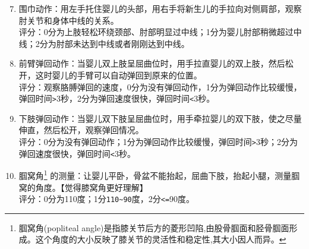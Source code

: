 \begin{enumerate}
\setcounter{enumi}{6}
\item
  围巾动作：用左手托住婴儿的头部，用右手将新生儿的手拉向对侧肩部，观察肘关节和身体中线的关系。\\
  评分：0分为上肢轻松环绕颈部、肘部明显过中线；1分为婴儿肘部稍微超过中线；2分为肘部未达到中线或者刚刚达到中线。%
\item
  前臂弹回动作：当婴儿双上肢呈屈曲位时，用手拉直婴儿的双上肢，然后松开，这时婴儿的手臂可以自动弹回到原来的位置。\\
  评分：观察胳膊弹回的速度，0分为没有弹回动作，1分为弹回动作比较缓慢，弹回时间\texttt{\textgreater{}}\hspace{0pt}3秒，2分为弹回速度很快，弹回时间\texttt{\textless{}}\hspace{0pt}3秒。%
\item
  下肢弹回动作：当婴儿双下肢呈屈曲位时，用手牵拉婴儿的双下肢，使之尽量伸直，然后松开，观察弹回情况。\\
  评分：0分为没有弹回动作；1分为弹回动作比较缓慢，弹回时间\texttt{\textgreater{}}\hspace{0pt}3秒；2分为弹回速度很快，弹回时间\texttt{\textless{}}\hspace{0pt}3秒。%
\item
  腘窝角\footnote{{\PinyinTi 腘}窝角(popliteal angle)是指膝关节后方的菱形凹陷,由股骨腘面和胫骨腘面形成。这个角度的大小反映了膝关节的灵活性和稳定性,其大小因人而异。}%
的测量：让婴儿平卧，骨盆不能抬起，屈曲下肢，抬起小腿，测量腘窝的角度。【觉得膝窝角更好理解】\\
  评分：0分为110度；1分\texttt{110\textasciitilde{}90}\hspace{0pt}度，2分\texttt{\textless{}=}\hspace{0pt}90度。%
\end{enumerate}

